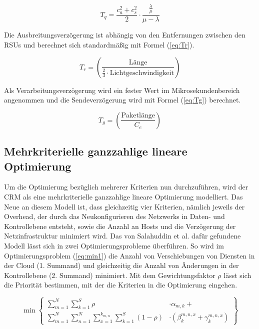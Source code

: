 \documentclass[conference]{IEEEtran}
\begin{document}
\begin{equation}
T_q=\frac{c_a^2+c_s^2}{2}\cdot \frac{\frac{\lambda}{\mu}}{\mu-\lambda}
\label{eq:Tq}
\end{equation}

Die Ausbreitungsverzögerung ist abhängig von den Entfernungen zwischen den RSUs und berechnet sich standardmäßig mit Formel (\ref{eq:Tr}).

\begin{equation}
T_r=\left(\frac{\text{L\"ange}}{\frac{2}{3}\cdot \text{Lichtgeschwindigkeit}}\right)
\label{eq:Tr}
\end{equation}

Als Verarbeitungsverzögerung wird ein fester Wert im Mikrosekundenbereich angenommen und die Sendeverzögerung wird mit Formel (\ref{eq:Tg}) berechnet.

\begin{equation}
T_g=\left(\frac{\text{Paketl\"ange}}{C_e}\right)
\label{eq:Tg}
\end{equation}


\subsection{Mehrkriterielle ganzzahlige lineare Optimierung}

Um die Optimierung bezüglich mehrerer Kriterien nun durchzuführen, wird der CRM als eine mehrkriterielle ganzzahlige lineare Optimierung modelliert. Das Neue an diesem Modell ist, dass gleichzeitig vier Kriterien, nämlich jeweils der Overhead, der durch das Neukonfigurieren des Netzwerks in Daten- und Kontrollebene entsteht, sowie die Anzahl an Hosts und die Verzögerung der Netzinfrastruktur minimiert wird. Das von Salahuddin et al. dafür gefundene Modell lässt sich in zwei Optimierungsprobleme überführen.
So wird im Optimierungsproblem (\ref{eq:min1}) die Anzahl von Verschiebungen von Diensten in der Cloud (1. Summand) und gleichzeitig die Anzahl von Änderungen in der Kontrollebene (2. Summand) minimiert. Mit dem Gewichtungsfaktor \(\rho\) lässt sich die Priorität bestimmen, mit der die Kriterien in die Optimierung eingehen. 

\begin{equation}
     \min\left\{\begin{split} \sum\limits_{m=1}^N \sum\limits_{k=1}^S \rho &\cdot\alpha_{m,k} + \\
         \sum\limits_{m=1}^N \sum\limits_{n=1}^N \sum\limits_{x=1}^{k_{m,n}}
\sum\limits_{k=1}^S (1-\rho)&\cdot(\beta_{k}^{m,n,x}+ \gamma_{k}^{m,n,x})\end{split}\right\}
\label{eq:min1}
\end{equation}
\end{document}
